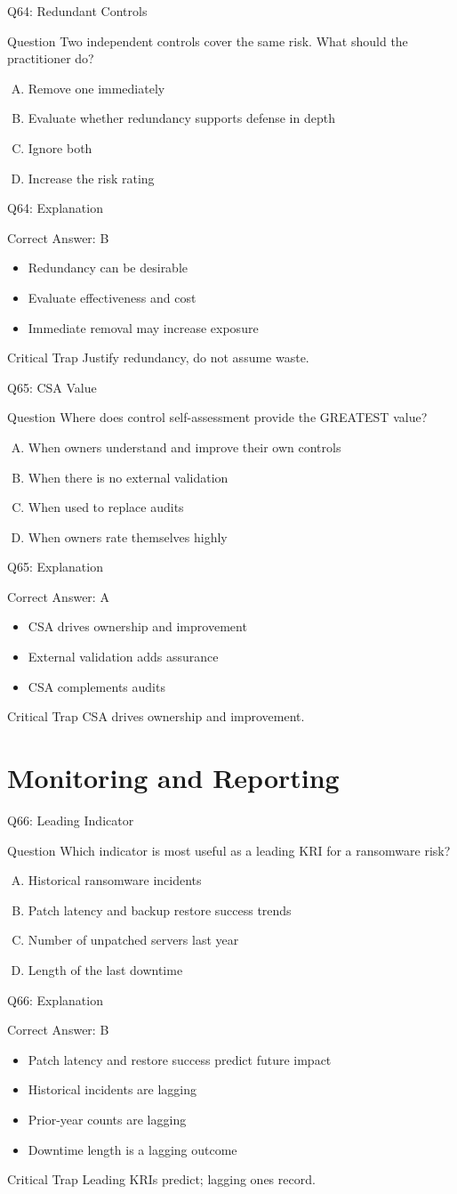 \documentclass[aspectratio=169]{beamer}
\newcommand{\hq}[7]{%
	\begin{frame}{Q#1: #2}
		\begin{block}{Question}
			#3
		\end{block}
		\begin{enumerate}[(A)]
			#4
		\end{enumerate}
	\end{frame}
	\begin{frame}{Q#1: Explanation}
		\begin{block}{Correct Answer: #5}
			\begin{itemize}
				#6
			\end{itemize}
		\end{block}
		\begin{alertblock}{Critical Trap}
			#7
		\end{alertblock}
	\end{frame}
}
\begin{document}
	\hq{64}{Redundant Controls}
	{Two independent controls cover the same risk. What should the practitioner do?}
	{\item Remove one immediately
		\item Evaluate whether redundancy supports defense in depth
		\item Ignore both
		\item Increase the risk rating}
	{B}
	{\item Redundancy can be desirable
		\item Evaluate effectiveness and cost
		\item Immediate removal may increase exposure}
	{Justify redundancy, do not assume waste.}
	
	\hq{65}{CSA Value}
	{Where does control self-assessment provide the GREATEST value?}
	{\item When owners understand and improve their own controls
		\item When there is no external validation
		\item When used to replace audits
		\item When owners rate themselves highly}
	{A}
	{\item CSA drives ownership and improvement
		\item External validation adds assurance
		\item CSA complements audits}
	{CSA drives ownership and improvement.}
	
	\section{Monitoring and Reporting}
	
	\hq{66}{Leading Indicator}
	{Which indicator is most useful as a leading KRI for a ransomware risk?}
	{\item Historical ransomware incidents
		\item Patch latency and backup restore success trends
		\item Number of unpatched servers last year
		\item Length of the last downtime}
	{B}
	{\item Patch latency and restore success predict future impact
		\item Historical incidents are lagging
		\item Prior-year counts are lagging
		\item Downtime length is a lagging outcome}
	{Leading KRIs predict; lagging ones record.}
	
\end{document}
